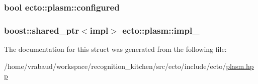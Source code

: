 \subsubsection[{configured}]{\setlength{\rightskip}{0pt plus 5cm}bool ecto\+::plasm\+::configured\hspace{0.3cm}{\ttfamily [private]}}\label{structecto_1_1plasm_a8d074da8290587fab0ed04d5cfe3f6b1}
\hypertarget{structecto_1_1plasm_a4cfd41e9dc82039a75970755565b2513}{}
\subsubsection[{impl\+\_\+}]{\setlength{\rightskip}{0pt plus 5cm}boost\+::shared\+\_\+ptr$<$impl$>$ ecto\+::plasm\+::impl\+\_\+\hspace{0.3cm}{\ttfamily [private]}}\label{structecto_1_1plasm_a4cfd41e9dc82039a75970755565b2513}


The documentation for this struct was generated from the following file\+:\begin{DoxyCompactItemize}
\item 
/home/vrabaud/workspace/recognition\+\_\+kitchen/src/ecto/include/ecto/\hyperlink{plasm_8hpp}{plasm.\+hpp}\end{DoxyCompactItemize}

